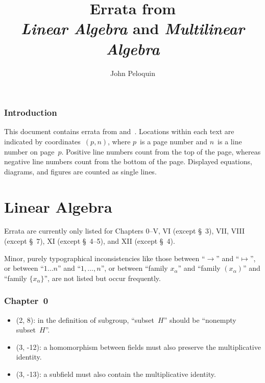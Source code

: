 \documentclass[letterpaper,12pt]{article}
\title{Errata from \\\textit{Linear Algebra} and \textit{Multilinear Algebra}}
\author{John Peloquin}
\date{}
\begin{document}
\maketitle

\section*{Introduction}
This document contains errata from \cite{greub1} and~\cite{greub2}. Locations within each text are indicated by coordinates~\((p,n)\), where \(p\)~is a page number and \(n\)~is a line number on page~\(p\). Positive line numbers count from the top of the page, whereas negative line numbers count from the bottom of the page. Displayed equations, diagrams, and figures are counted as single lines.

\newpage
\part*{Linear Algebra}
Errata are currently only listed for Chapters 0--V, VI (except \S~3), VII, VIII (except \S~7), XI (except \S~4--5), and XII (except \S~4).

Minor, purely typographical inconsistencies like those between ``\(\to\)'' and ``\(\mapsto\)'', or between ``\(1\ldots n\)'' and ``\(1,\ldots,n\)'', or between ``family \(x_{\alpha}\)'' and ``family \((x_{\alpha})\)'' and ``family \(\{x_{\alpha}\}\)'', are not listed but occur frequently.

\section*{Chapter~0}
\begin{itemize}
\item (2, 8): in the definition of subgroup, ``subset~\(H\)'' should be ``nonempty subset~\(H\)''.
\item (3, -12): a homomorphism between fields must also preserve the multiplicative identity.
\item (3, -13): a subfield must also contain the multiplicative identity.
\end{itemize}
\end{document}
